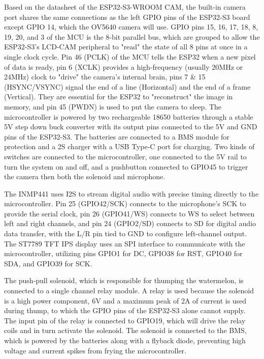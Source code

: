 \begin{thesisprose}
Based on the datasheet of the ESP32-S3-WROOM CAM, the built-in camera port shares the same connections as the left GPIO pins of the ESP32-S3 board except GPIO 14, which the OV5640 camera will use. GPIO pins 15, 16, 17, 18, 8, 19, 20, and 3 of the MCU is the 8-bit parallel bus, which are grouped to allow the ESP32-S3's LCD-CAM peripheral to "read" the state of all 8 pins at once in a single clock cycle. Pin 46 (PCLK) of the MCU tells the ESP32 when a new pixel of data is ready, pin 6 (XCLK) provides a high-frequency (usually 20MHz or 24MHz) clock to "drive" the camera's internal brain, pins 7 \& 15 (HSYNC/VSYNC) signal the end of a line (Horizontal) and the end of a frame (Vertical). They are essential for the ESP32 to "reconstruct" the image in memory, and pin 45 (PWDN) is used to put the camera to sleep. The microcontroller is powered by two rechargeable 18650 batteries through a stable 5V step down buck converter with its output pins connected to the 5V and GND pins of the ESP32-S3. The batteries are connected to a BMS module for protection and a 2S charger with a USB Type-C port for charging. Two kinds of switches are connected to the microcontroller, one connected to the 5V rail to turn the system on and off, and a pushbutton connected to GPIO45 to trigger the camera then both the solenoid and microphone.

The INMP441 uses I2S to stream digital audio with precise timing directly to the microcontroller. Pin 25 (GPIO42/SCK) connects to the microphone’s SCK to provide the serial clock, pin 26 (GPIO41/WS) connects to WS to select between left and right channels, and pin 24 (GPIO2/SD) connects to SD for digital audio data transfer, with the L/R pin tied to GND to configure left-channel output. The ST7789 TFT IPS display uses an SPI interface to communicate with the microcontroller, utilizing pins GPIO1 for DC, GPIO38 for RST, GPIO40 for SDA, and GPIO39 for SCK.

The push-pull solenoid, which is responsible for thumping the watermelon, is connected to a single channel relay module. A relay is used because the solenoid is a high power component, 6V and a maximum peak of 2A of current is used during thump, to which the GPIO pins of the ESP32-S3 alone cannot supply. The input pin of the relay is connected to GPIO19, which will drive the relay coils and in turn activate the solenoid. The solenoid is connected to the BMS, which is powered by the batteries along with a flyback diode, preventing high voltage and current spikes from frying the microcontroller.


\end{thesisprose}

